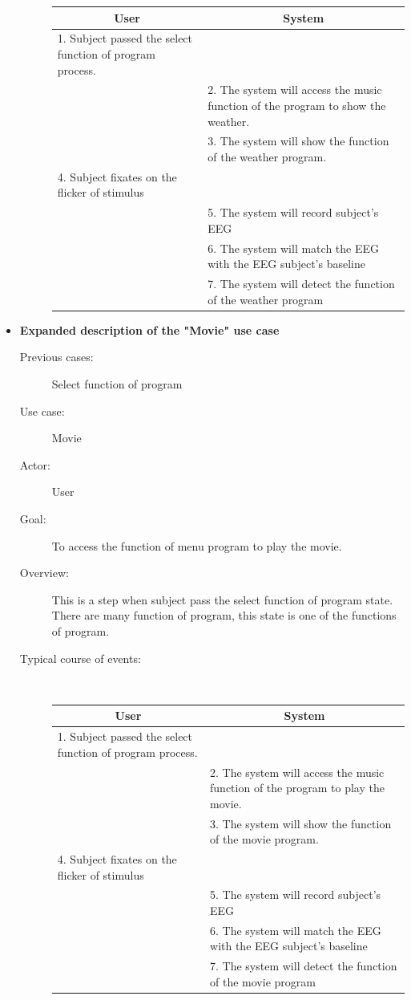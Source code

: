 \begin{itemize}
\begin{description}
{\begin{tabular}{| m{.47\linewidth} | m{.47\linewidth} |}
			\hline 
			\multicolumn{1}{|c}{\textbf{User}} & 
  			\multicolumn{1}{|c|}{\textbf{System}}\\
			\hline 
			1. Subject passed the select function of program process. &   \\
			\hline 
			 & 2. The system will access the music function of the program to show the weather.  \\
			\hline 
			& 3. The system will show the function of the weather program. \\
			\hline 
			4. Subject fixates on the flicker of stimulus &  \\
			\hline
			 & 5. The system will record subject's EEG \\
\hline
			& 6. The system will match the EEG with the EEG subject's baseline\\
			\hline
            & 7. The system will detect the function of the weather program\\
			\hline
		\end{tabular}
	}
	
\end{description}

\newpage
\item \textbf{Expanded description of the "Movie" use case }
\begin{description}
	\item [Previous cases:] Select function of program
	\item [Use case:] Movie
	\item [Actor:] User  
	\item [Goal:] To access the function of menu program to play the movie. 
	\item [Overview:] This is a step when subject pass the select function of program state. There are many function of program, this state is one of the functions of program. 
	\item [Typical course of events:]~
	
	{
		\centering
		\begin{tabular}{| m{.47\linewidth} | m{.47\linewidth} |}
			
			\hline 
			\multicolumn{1}{|c}{\textbf{User}} & 
  			\multicolumn{1}{|c|}{\textbf{System}}\\
			\hline 
			1. Subject passed the select function of program process. &   \\
			\hline 
			 & 2. The system will access the music function of the program to play the movie.  \\
			\hline 
			& 3. The system will show the function of the movie program. \\
			\hline 
			4. Subject fixates on the flicker of stimulus &  \\
			\hline
			 & 5. The system will record subject's EEG \\
\hline
			& 6. The system will match the EEG with the EEG subject's baseline\\
			\hline
            & 7. The system will detect the function of the movie program\\
			\hline
		\end{tabular}
	}
	

\end{description}
\end{itemize}
